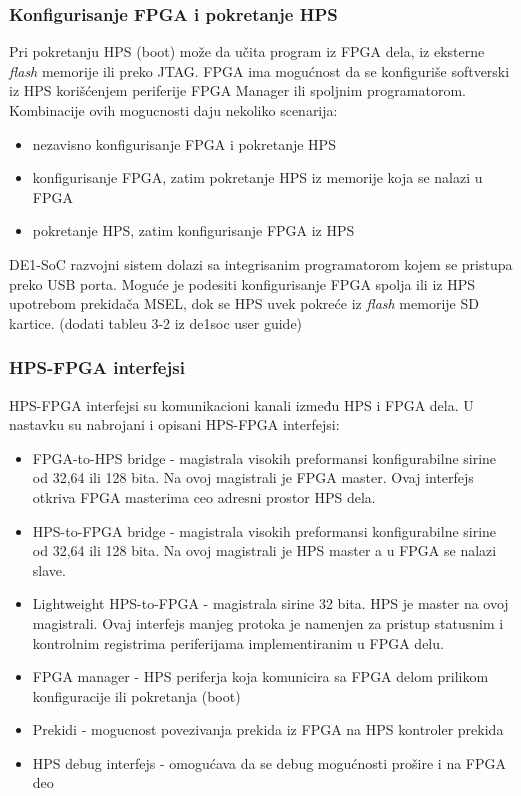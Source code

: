 \subsubsection{Konfigurisanje FPGA i pokretanje HPS}
Pri pokretanju HPS (boot) može da učita program iz FPGA dela, iz eksterne \textit{flash} memorije ili preko JTAG. FPGA ima mogućnost da se konfiguriše softverski iz HPS korišćenjem periferije FPGA Manager ili spoljnim programatorom. Kombinacije ovih mogucnosti daju nekoliko scenarija:
\begin{itemize}
\item nezavisno konfigurisanje FPGA i pokretanje HPS
\item konfigurisanje FPGA, zatim pokretanje HPS iz memorije koja se nalazi u FPGA
\item pokretanje HPS, zatim konfigurisanje FPGA iz HPS
\end{itemize}
DE1-SoC razvojni sistem dolazi sa integrisanim programatorom kojem se pristupa preko USB porta. Moguće je podesiti konfigurisanje FPGA spolja ili iz HPS upotrebom prekidača MSEL, dok se HPS uvek pokreće iz \textit{flash} memorije SD kartice.
(dodati tableu 3-2 iz de1soc user guide)

\subsubsection{HPS-FPGA interfejsi}
HPS-FPGA interfejsi su komunikacioni kanali između HPS i FPGA dela. U nastavku su nabrojani i opisani HPS-FPGA interfejsi:
\begin{itemize}
\item  FPGA-to-HPS bridge - magistrala visokih preformansi konfigurabilne sirine od 32,64 ili 128 bita. Na ovoj magistrali je FPGA master. Ovaj interfejs otkriva FPGA masterima ceo adresni prostor HPS dela.
\item HPS-to-FPGA bridge - magistrala visokih preformansi konfigurabilne sirine od 32,64 ili 128 bita. Na ovoj magistrali je HPS master a u FPGA se nalazi slave.
\item Lightweight HPS-to-FPGA - magistrala sirine 32 bita. HPS je master na ovoj magistrali. Ovaj interfejs manjeg protoka je namenjen za pristup statusnim i kontrolnim registrima periferijama implementiranim u FPGA delu.
\item FPGA manager - HPS periferja koja komunicira sa FPGA delom prilikom konfiguracije ili pokretanja (boot)
\item Prekidi - mogucnost povezivanja prekida iz FPGA na HPS kontroler prekida
\item HPS debug interfejs - omogućava da se debug mogućnosti prošire i na FPGA deo
\end{itemize}

